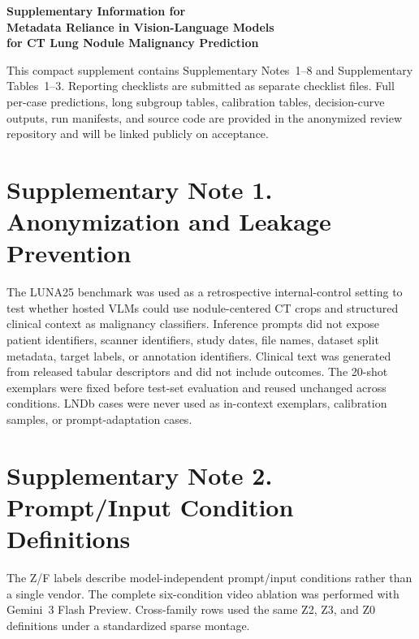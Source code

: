 \documentclass[11pt]{article}
\begin{document}
\doublespacing

\begin{center}
{\LARGE\bfseries Supplementary Information for\\
Metadata Reliance in Vision-Language Models\\
for CT Lung Nodule Malignancy Prediction\par}
\end{center}
\vspace{0.75em}

\linenumbers

\noindent This compact supplement contains Supplementary Notes~1--8 and
Supplementary Tables~1--3. Reporting checklists are submitted as separate
checklist files. Full per-case predictions, long subgroup tables, calibration
tables, decision-curve outputs, run manifests, and source code are provided in
the anonymized review repository and will be linked publicly on acceptance.

\section*{Supplementary Note 1. Anonymization and Leakage Prevention}

The LUNA25 benchmark was used as a retrospective internal-control setting to
test whether hosted VLMs could use nodule-centered CT crops and structured
clinical context as malignancy classifiers. Inference prompts did not expose
patient identifiers, scanner identifiers, study dates, file names, dataset split
metadata, target labels, or annotation identifiers. Clinical text was generated
from released tabular descriptors and did not include outcomes. The 20-shot
exemplars were fixed before test-set evaluation and reused unchanged across
conditions. LNDb cases were never used as in-context exemplars, calibration
samples, or prompt-adaptation cases.

\section*{Supplementary Note 2. Prompt/Input Condition Definitions}

The Z/F labels describe model-independent prompt/input conditions rather than a
single vendor. The complete six-condition video ablation was performed with
Gemini~3 Flash Preview. Cross-family rows used the same Z2, Z3, and Z0
definitions under a standardized sparse montage.
\end{document}
